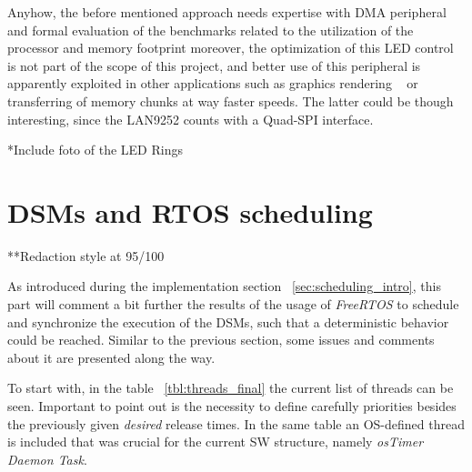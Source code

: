Anyhow, the before mentioned approach needs expertise with DMA peripheral and formal evaluation of the benchmarks related to 
the utilization
of the processor and memory footprint moreover, the optimization of this LED control is not part of the scope of this project, and 
better use of this peripheral is apparently exploited in other applications such as graphics rendering ~\cite{stm32_dmaapp} or transferring of
memory chunks at way faster speeds. The latter could be though interesting, since the LAN9252 counts with a Quad-SPI interface.

*Include foto of the LED Rings


\section{DSMs and RTOS scheduling}\label{sec:scheduling_results}
**Redaction style at 95/100

        
     

As introduced during the implementation section ~\ref{sec:scheduling_intro}, this part will comment a bit further the results
of the usage of \emph{FreeRTOS} to schedule and synchronize the execution of the DSMs, such that a deterministic behavior 
could be reached. Similar to the previous section, some issues and comments about it are presented along the
way.

To start with, in the table ~\ref{tbl:threads_final} the current list of threads can be seen. Important to point out is the necessity 
to define carefully priorities besides the previously given \emph{desired} release times. In the same table an 
OS-defined thread is included that was crucial for the current SW structure, namely \emph{osTimer Daemon Task}. 

